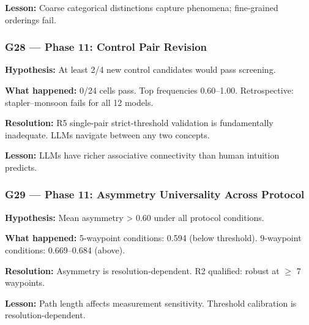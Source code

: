 \textbf{Lesson:} Coarse categorical distinctions capture phenomena; fine-grained orderings fail.

\subsubsection{G28 --- Phase 11: Control Pair Revision}\label{g28-phase-11-control-pair-revision}

\textbf{Hypothesis:} At least 2/4 new control candidates would pass screening.

\textbf{What happened:} 0/24 cells pass. Top frequencies 0.60--1.00. Retrospective: stapler--monsoon fails for all 12 models.

\textbf{Resolution:} R5 single-pair strict-threshold validation is fundamentally inadequate. LLMs navigate between any two concepts.

\textbf{Lesson:} LLMs have richer associative connectivity than human intuition predicts.

\subsubsection{G29 --- Phase 11: Asymmetry Universality Across Protocol}\label{g29-phase-11-asymmetry-universality-across-protocol}

\textbf{Hypothesis:} Mean asymmetry \textgreater{} 0.60 under all protocol conditions.

\textbf{What happened:} 5-waypoint conditions: 0.594 (below threshold). 9-waypoint conditions: 0.669--0.684 (above).

\textbf{Resolution:} Asymmetry is resolution-dependent. R2 qualified: robust at \(\geq\) 7 waypoints.

\textbf{Lesson:} Path length affects measurement sensitivity. Threshold calibration is resolution-dependent.

